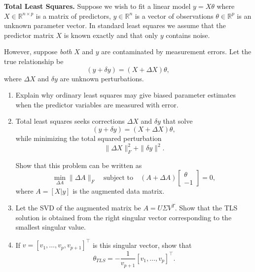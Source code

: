 \begin{myexercise}
\textbf{Total Least Squares.} Suppose we wish to fit a linear model $y = X\theta$ where
$X \in \mathbb{R}^{n \times p}$ is a matrix of predictors, $y \in \mathbb{R}^n$ is a vector of observations $\theta \in \mathbb{R}^p$ is an unknown parameter vector. In standard least squares we assume that the predictor matrix $X$ is known exactly and that only $y$ contains noise.

However, suppose {\em both} $X$ and $y$ are contaminated by measurement errors. Let the true relationship be
$$
(y + \delta y) = (X + \Delta X)\theta,
$$
where $\Delta X$ and $\delta y$ are unknown perturbations.

\begin{enumerate}
\item  Explain why ordinary least squares may give biased parameter estimates when the predictor variables are measured with error.
\item
Total least squares seeks corrections $\Delta X$ and $\delta y$ that solve
$$
(y + \delta y) = (X + \Delta X)\theta,
$$
while minimizing the total squared perturbation
$$
\|\Delta X\|_F^2 + \|\delta y\|^2.
$$

Show that this problem can be written as
$$
\min_{\Delta A} \|\Delta A\|_F
\quad 
\text{subject to} \quad (A + \Delta A)
\begin{bmatrix}
\theta \\
-1
\end{bmatrix}
= 0,
$$
where $A = [X | y]$ is the augmented data matrix.

\item
Let the SVD of the augmented matrix be $A = U \Sigma V^T.$
Show that the TLS solution is obtained from the right singular vector corresponding to the smallest singular value.

\item 
If $v =[v_1, \dots, v_p, v_{p+1}]^\top$
is this singular vector, show that
$$
\theta_{TLS} = -\frac{1}{v_{p+1}}
[v_1,\dots, v_p]^\top.
$$
\end{enumerate}
\end{myexercise}

